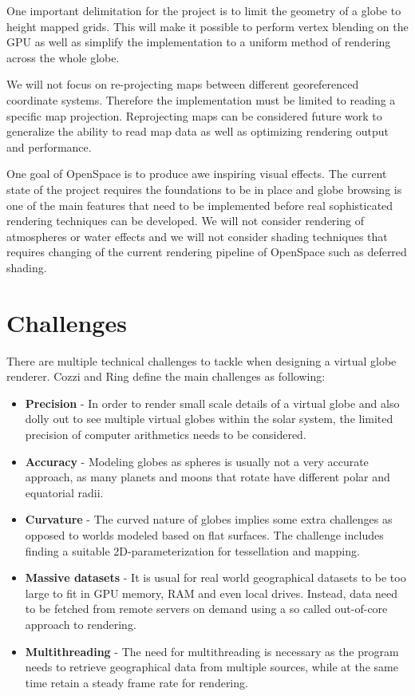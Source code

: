 One important delimitation for the project is to limit the geometry of a globe to height mapped grids. This will make it possible to perform vertex blending on the GPU as well as simplify the implementation to a uniform method of rendering across the whole globe.

We will not focus on re-projecting maps between different georeferenced coordinate systems. Therefore the implementation must be limited to reading a specific map projection. Reprojecting maps can be considered future work to generalize the ability to read map data as well as optimizing rendering output and performance.

One goal of OpenSpace is to produce awe inspiring visual effects. The current state of the project requires the foundations to be in place and globe browsing is one of the main features that need to be implemented before real sophisticated rendering techniques can be developed. We will not consider rendering of atmospheres or water effects and we will not consider shading techniques that requires changing of the current rendering pipeline of OpenSpace such as deferred shading.

\section{Challenges}

There are multiple technical challenges to tackle when designing a virtual globe renderer. Cozzi and Ring \cite{cozzi11} define the main challenges as following:

\begin{itemize}

\item \textbf{Precision} - In order to render small scale details of a virtual globe and also dolly out to see multiple virtual globes within the solar system, the limited precision of computer arithmetics needs to be considered.
\item \textbf{Accuracy} - Modeling globes as spheres is usually not a very accurate approach, as many planets and moons that rotate have different polar and equatorial radii.
\item \textbf{Curvature} - The curved nature of globes implies some extra challenges as opposed to worlds modeled based on flat surfaces. The challenge includes finding a suitable 2D-parameterization for tessellation and mapping.
\item \textbf{Massive datasets} - It is usual for real world geographical datasets to be too large to fit in GPU memory, RAM and even local drives. Instead, data need to be fetched from remote servers on demand using a so called out-of-core approach to rendering.
\item \textbf{Multithreading} - The need for multithreading is necessary as the program needs to retrieve geographical data from multiple sources, while at the same time retain a steady frame rate for rendering.

\end{itemize}

